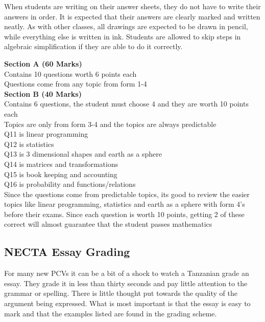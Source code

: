       When students are writing on their answer sheets, they do not have to write their answers in order.  It is expected that their answers are clearly marked and written neatly.  As with other classes, all drawings are expected to be drawn in pencil, while everything else is written in ink.  Students are allowed to skip steps in algebraic simplification if they are able to do it correctly. 
\begin{flushleft}
    
\textbf{Section A (60 Marks) }\\
Contains 10 questions worth 6 points each\\
Questions come from any topic from form 1-4\\
 
\textbf{Section B (40 Marks)} \\[20pt]

Contains 6 questions, the student must choose 4 and they are worth 10 points each\\
Topics are only from form 3-4 and the topics are always predictable\\[20pt]

Q11 is linear programming\\
Q12 is statistics\\
Q13 is 3 dimensional shapes and earth as a sphere\\
Q14 is matrices and transformations\\
Q15 is book keeping and accounting\\
Q16 is probability and functions/relations\\[20pt]

Since the questions come from predictable topics, its good to review the easier topics like linear programming, statistics and earth as a sphere with form 4's before their exams.  Since each question is worth 10 points, getting 2 of these correct will almost guarantee that the student passes mathematics\\

\end{flushleft}  
 
\subsection{NECTA Essay Grading} 
  For many new PCVs it can be a bit of a shock to watch a Tanzanian grade an essay.  They grade it in less than thirty seconds and pay little attention to the grammar or spelling.  There is little thought put towards the quality of the argument being expressed.  What is most important is that the essay is easy to mark and that the examples listed are found in the grading scheme.   

